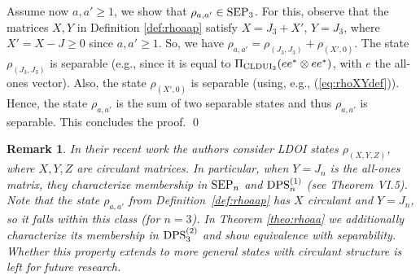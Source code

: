 \documentclass[11pt]{article}
\makeatletter
\newcommand{\PCP}{\text{\rm PCP}}
\newcommand{\SEP}{\text{\rm SEP}}
\newcommand{\CP}{\text{\rm CP}}
\newcommand{\CLDUI}{\text{\rm CLDUI}}
\newcommand{\DPS}{\text{\rm DPS}}
\newcommand{\ot}{\otimes}
\theoremstyle{plain}
\newtheorem{remark}[satz]{Remark}
\renewenvironment{proof}[1][\proofname]{%
  \par
  \pushQED{}%
  \normalfont
  \topsep6\p@\@plus6\p@
  \trivlist
  \item[\hskip\labelsep\itshape #1\@addpunct{.}]%
}{%
  \popQED
  \endtrivlist
}
\makeatother
\begin{document}
\begin{proof}
Assume now $a,a'\ge 1$, we show that $\rho_{a,a'}\in\SEP_3$. For this, observe that  the matrices $X,Y$ in Definition \ref{def:rhoaap} satisfy 
    $X=J_3+X'$, $Y=J_3$, where $X'=X-J\ge 0$ since $a,a'\ge 1$. 
    So, we have 
    $\rho_{a,a'}=\rho_{(J_3,J_3)}+\rho_{(X',0)}$.
The   state $\rho_{(J_3,J_3)}$ is   separable (e.g., since it is equal to $\Pi_{\CLDUI_3}(ee^*\ot ee^*)$, with $e$ the all-ones vector).
Also, the state $\rho_{(X',0)}$ is separable (using, e.g., (\ref{eq:rhoXYdef})).
Hence, the state $\rho_{a,a'}$ is the sum of two separable states and thus $\rho_{a,a'}$ is separable.
    This concludes the proof. %
\qed\end{proof}

\begin{remark}
In their recent work \cite{GNS-cyclic_2025} the authors consider LDOI states $\rho_{(X,Y,Z)}$, where   $X,Y,Z$ are circulant matrices. In particular, when $Y=J_n$ is the all-ones matrix, they characterize membership in $\SEP_n$ and $\DPS^{(1)}_n$ (see Theorem VI.5). Note that the state $\rho_{a,a'}$ from Definition~\ref{def:rhoaap}
has $X$ circulant and $Y=J_n$, so it falls within this class (for $n=3$). In Theorem \ref{theo:rhoaa} we additionally characterize its membership in $\DPS^{(2)}_3$ and show equivalence with separability. Whether this property extends to more general states  with circulant structure is left for future research.
\end{remark}
\end{document}
